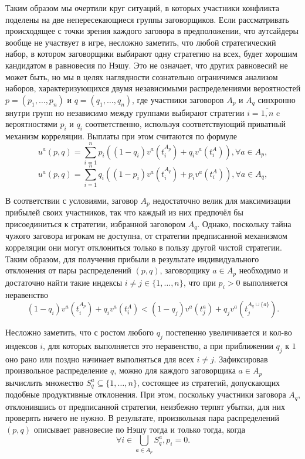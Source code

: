 Таким образом мы очертили круг ситуаций, в которых участники конфликта поделены на две непересекающиеся группы заговорщиков. Если рассматривать происходящее с точки зрения каждого заговора в предположении, что аутсайдеры вообще не участвует в игре, несложно заметить, что любой стратегический набор, в котором заговорщики выбирают одну стратегию на всех, будет хорошим кандидатом в равновесия по Нэшу. Это не означает, что других равновесий не может быть, но мы в целях наглядности сознательно ограничимся анализом наборов, характеризующихся двумя независимыми распределениями вероятностей $p = (p_1, \ldots, p_n)$ и $q = (q_1, \ldots, q_n)$, где участники заговоров $A_p$ и $A_q$ синхронно внутри групп но независимо между группами выбирают стратегии $i = \overline{1,n}$ c вероятностями $p_i$ и $q_i$ соответственно, используя соответствующий приватный механизм корреляции. Выплаты при этом считаются по формуле
\begin{equation*}
	u^a(p, q) = \sum_{i=1}^n p_i ((1 - q_i) v^a(t_i^{A_p}) + q_i v^a(t_i^A)), \forall a \in A_p,
\end{equation*}
\begin{equation*}
	u^a(p, q) = \sum_{i=1}^n q_i ((1 - p_i) v^a(t_i^{A_q}) + p_i v^a(t_i^A)), \forall a \in A_q,
\end{equation*}

В соответствии с условиями, заговор $A_p$ недостаточно велик для максимизации прибылей своих участников, так что каждый из них предпочёл бы присоединиться к стратегии, избранной заговором $A_q$. Однако, поскольку тайна чужого заговора игрокам не доступна, от стратегии предписанной механизмом корреляции они могут отклониться только в пользу другой чистой стратегии. Таким образом, для получения прибыли в результате индивидуального отклонения от пары распределений $(p, q)$, заговорщику $a \in A_p$ необходимо и достаточно найти такие индексы $i \neq j \in \{1, \ldots, n\}$, что при $p_i > 0$ выполняется неравенство
\begin{equation*}
	(1 - q_i) v^a(t_i^{A_p}) + q_i v^a(t_i^A) < (1 - q_j) v^a(t_j^a) + q_j v^a(t_j^{A_q \cup \{a\}}).
\end{equation*}

Несложно заметить, что с ростом любого $q_j$ постепенно увеличивается и кол-во индексов $i$, для которых выполняется это неравенство, а при приближении $q_j$ к $1$ оно рано или поздно начинает выполняться для всех $i \neq j$. Зафиксировав произвольное распределение $q$, можно для каждого заговорщика $a \in A_p$ вычислить множество $S^a_q \subseteq \{1, \ldots, n\}$, состоящее из стратегий, допускающих подобные продуктивные отклонения. При этом, поскольку участники заговора $A_q$, отклонившись от предписанной стратегии, неизбежно терпят убытки, для них проверять ничего не нужно. В результате, произвольная пара распределений $(p, q)$ описывает равновесие по Нэшу тогда и только тогда, когда
\begin{equation*}
	\forall i \in \bigcup_{a \in A_p} S^a_q, p_i = 0.
\end{equation*}

